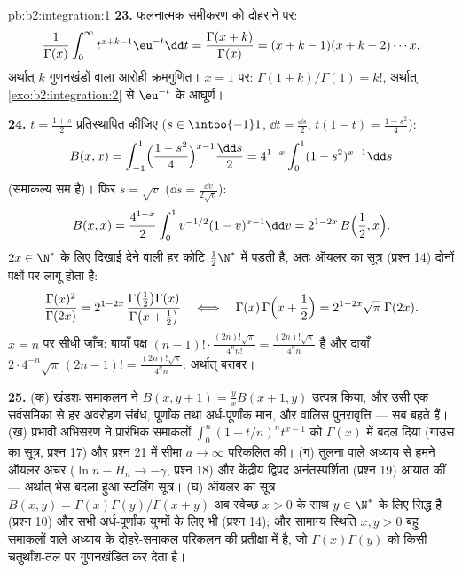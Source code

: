 \begin{solution}{pb:b2:integration:1}
\textbf{23.} फलनात्मक समीकरण को दोहराने पर:
\[
\frac{1}{\Gamma(x)}\int_0^\infty t^{x+k-1}\eu^{-t}\dd t
= \frac{\Gamma(x+k)}{\Gamma(x)}
= (x+k-1)(x+k-2)\cdots x ,
\]
अर्थात् $k$ गुणनखंडों वाला आरोही क्रमगुणित। $x = 1$ पर: $\Gamma(1+k)/\Gamma(1) = k!$, अर्थात् \cref{exo:b2:integration:2} से
$\eu^{-t}$ के आघूर्ण।

\textbf{24.} $t = \frac{1+s}2$ प्रतिस्थापित कीजिए ($s \in
\intoo{-1}1$, $\dd t = \frac{\dd s}2$, $t(1-t) =
\frac{1-s^2}4$):
\[
B(x,x) = \int_{-1}^{1}\Bigl(\frac{1-s^2}{4}\Bigr)^{x-1}
\frac{\dd s}{2}
= 4^{1-x}\int_0^1 (1-s^2)^{x-1}\dd s
\]
(समाकल्य सम है)। फिर $s = \sqrt v$ ($\dd s =
\frac{\dd v}{2\sqrt v}$):
\[
B(x,x) = \frac{4^{1-x}}{2}\int_0^1
v^{-1/2}(1-v)^{x-1}\dd v
= 2^{1-2x}\,B\Bigl(\frac12, x\Bigr) .
\]
$2x \in \N^*$ के लिए दिखाई देने वाली हर कोटि $\frac12\N^*$ में पड़ती है, अतः ऑयलर का सूत्र
(प्रश्न 14) दोनों पक्षों पर लागू होता है:
\[
\frac{\Gamma(x)^2}{\Gamma(2x)}
= 2^{1-2x}\,
\frac{\Gamma\bigl(\frac12\bigr)\Gamma(x)}
{\Gamma\bigl(x+\frac12\bigr)}
\quad\Longleftrightarrow\quad
\Gamma(x)\,\Gamma\Bigl(x+\frac12\Bigr)
= 2^{1-2x}\sqrt\pi\;\Gamma(2x) .
\]
$x = n$ पर सीधी जाँच: बायाँ पक्ष $(n-1)!\cdot
\frac{(2n)!\sqrt\pi}{4^n n!} = \frac{(2n)!\sqrt\pi}{4^n n}$ है और दायाँ $2\cdot4^{-n}\sqrt\pi\,(2n-1)! =
\frac{(2n)!\sqrt\pi}{4^n n}$: अर्थात् बराबर।

\textbf{25.} (क) खंडशः समाकलन ने $B(x,y+1) =
\frac yx B(x+1,y)$ उत्पन्न किया, और उसी एक सर्वसमिका
से हर अवरोहण संबंध, पूर्णांक तथा अर्ध-पूर्णांक मान, और वालिस पुनरावृत्ति
--- सब बहते हैं। (ख) प्रभावी अभिसरण ने प्रारंभिक समाकलों $\int_0^n(1-t/n)^n t^{x-1}$ को $\Gamma(x)$ में
बदल दिया (गाउस का सूत्र, प्रश्न 17) और प्रश्न 21 में सीमा $a \to \infty$ परिकलित की।
(ग) तुलना वाले अध्याय से हमने ऑयलर अचर ($\ln n - H_n \to
-\gamma$, प्रश्न 18) और केंद्रीय
द्विपद अनंतस्पर्शिता (प्रश्न 19) आयात कीं --- अर्थात् भेस बदला हुआ
स्टर्लिंग सूत्र। (घ) ऑयलर का सूत्र $B(x,y) = \Gamma(x)\Gamma(y)/\Gamma(x+y)$ अब स्वेच्छ $x > 0$ के साथ $y \in \N^*$ के लिए
सिद्ध है (प्रश्न 10) और सभी अर्ध-पूर्णांक युग्मों के लिए भी (प्रश्न 14);
और सामान्य स्थिति $x, y > 0$ बहु समाकलों वाले अध्याय के दोहरे-समाकल परिकलन की
प्रतीक्षा में है, जो $\Gamma(x)\Gamma(y)$ को किसी चतुर्थांश-तल पर गुणनखंडित कर देता है।
\end{solution}
